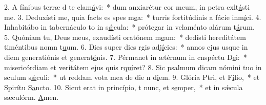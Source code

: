 2. A fínibus terræ d te clam\uline{á}vi:~* dum anxiarétur cor meum, in petra exlt\uline{á}sti me.
3. Deduxísti me, quia facts es spes m\uline{e}a:~* turris fortitúdinis a fácie inm\uline{í}ci.
4. Inhabitábo in tabernáculo to in s\uline{ǽ}cula:~* prótegar in velaménto alárum t\uline{á}rum.
5. Quóniam tu, Deus meus, exaudísti oratónem m\uline{e}am:~* dedísti hereditátem timéntibus nomn t\uline{u}um.
6. Dies super dies rgis adj\uline{í}cies:~* annos ejus usque in diem generatiónis et generat\uline{ó}nis.
7. Pérmanet in ætérnum in cnspéctu D\uline{e}i:~* misericórdiam et veritátem ejus quis r\uline{quí}ret?
8. Sic psalmum dicam nómini tuo in sculum s\uline{ǽ}culi:~* ut reddam vota mea de die n d\uline{i}em.
9. Glória Ptri, et F\uline{í}lio,~* et Spirítu S\uline{a}ncto.
10. Sicut erat in princípio, t nunc, et s\uline{e}mper,~* et in sǽcula sæculórm. \uline{A}men.

